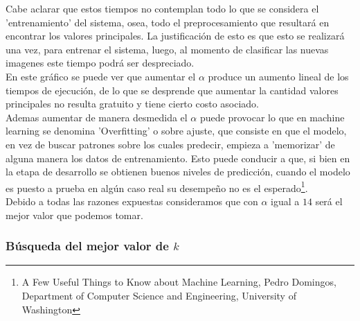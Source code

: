 Cabe aclarar que estos tiempos no contemplan todo lo que se considera el 'entrenamiento' del sistema, osea, todo el preprocesamiento que resultará en encontrar los valores principales. La justificación de esto es que esto se realizará una vez, para entrenar el sistema, luego, al momento de clasificar las nuevas imagenes este tiempo podrá ser despreciado.
\\
En este gráfico se puede ver que aumentar el $\alpha$ produce un aumento lineal de los tiempos de ejecución, de lo que se desprende que aumentar la cantidad valores principales no resulta gratuito y tiene cierto costo asociado.
\\
Ademas aumentar de manera desmedida el $\alpha$ puede provocar lo que en machine learning se denomina 'Overfitting' o sobre ajuste, que consiste en que el modelo, en vez de buscar patrones sobre los cuales predecir, empieza a 'memorizar' de alguna manera los datos de entrenamiento. Esto puede conducir a que, si bien en la etapa de desarrollo se obtienen buenos niveles de predicción, cuando el modelo es puesto a prueba en algún caso real su desempeño no es el esperado\footnote{\label{note1}A Few Useful Things to Know about Machine Learning, Pedro Domingos, Department of Computer Science and Engineering, University of Washington}.
\\
Debido a todas las razones expuestas consideramos que con $\alpha$ igual a $14$ será el mejor valor que podemos tomar.
\\
\subsubsection{Búsqueda del mejor valor de $k$}

